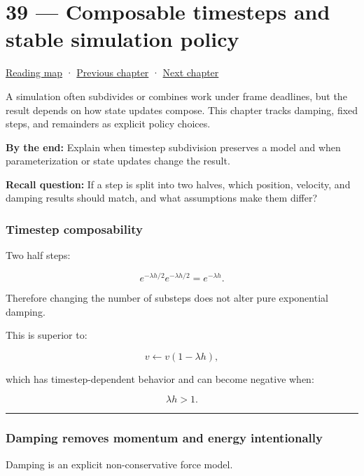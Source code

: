 \hypertarget{06-engine-ii-ch039}{}
\chapter{39 --- Composable timesteps and stable simulation policy}\label{06-engine-ii-ch039-composable-timesteps-and-stable-simulation-policy}

\hyperref[volume-reading-map]{Reading map} · \hyperref[06-engine-ii-ch038]{Previous chapter} · \hyperref[06-engine-ii-ch040]{Next chapter}

A simulation often subdivides or combines work under frame deadlines, but the result depends on how state updates compose. This chapter tracks damping, fixed steps, and remainders as explicit policy choices.

\textbf{By the end:} Explain when timestep subdivision preserves a model and when parameterization or state updates change the result.

\textbf{Recall question:} If a step is split into two halves, which position, velocity, and damping results should match, and what assumptions make them differ?

\subsection{Timestep composability}\label{06-engine-ii-ch039-timestep-composability}

Two half steps:

\[
e^{-\lambda h/2}
e^{-\lambda h/2}
=
e^{-\lambda h}.
\]

Therefore changing the number of substeps does not alter pure exponential damping.

This is superior to:

\[
v\leftarrow v(1-\lambda h),
\]

which has timestep-dependent behavior and can become negative when:

\[
\lambda h>1.
\]

\begin{center}\rule{0.5\linewidth}{0.5pt}\end{center}

\subsection{Damping removes momentum and energy intentionally}\label{06-engine-ii-ch039-damping-removes-momentum-and-energy-intentionally}

Damping is an explicit non-conservative force model.

